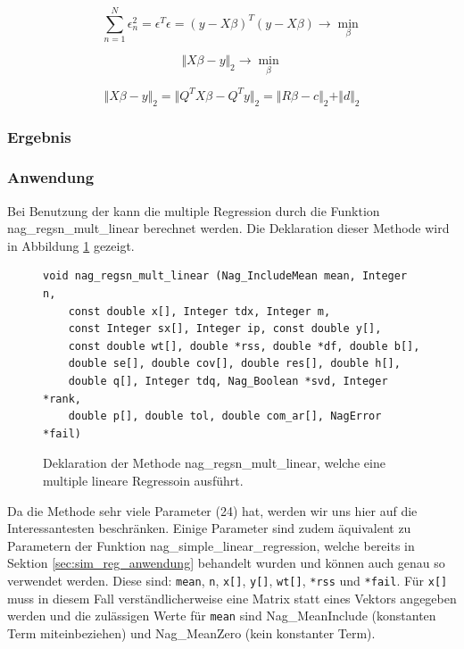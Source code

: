 \begin{equation}
  \label{eq:minimization}
  \sum\limits^{N}_{n=1} \epsilon^2_n = \epsilon^T \epsilon = (y - X \beta)^T (y - X \beta) \rightarrow \min\limits_{\beta}
\end{equation}


\begin{equation}
  \label{eq:minimization_general}
  \Vert X\beta - y \Vert_2 \rightarrow \min\limits_{\beta}
\end{equation}

\begin{equation}
  \label{eq:orthogonal_transformation}
  \Vert X\beta - y \Vert_2 = \Vert Q^T X \beta - Q^T y \Vert_2 = \Vert R \beta - c \Vert_2 + \Vert d \Vert_2
\end{equation}

\subsubsection{Ergebnis}

\subsubsection{Anwendung}

Bei Benutzung der \naglib kann die multiple Regression durch die Funktion nag\_regsn\_mult\_linear berechnet werden.
Die Deklaration dieser Methode wird in Abbildung \ref{fig:nag_multiple_linear} gezeigt.
\begin{figure}[t]
  \centering
\begin{lstlisting}
void nag_regsn_mult_linear (Nag_IncludeMean mean, Integer n, 
    const double x[], Integer tdx, Integer m, 
    const Integer sx[], Integer ip, const double y[], 
    const double wt[], double *rss, double *df, double b[], 
    double se[], double cov[], double res[], double h[], 
    double q[], Integer tdq, Nag_Boolean *svd, Integer *rank, 
    double p[], double tol, double com_ar[], NagError *fail)
\end{lstlisting}
  \caption{Deklaration der Methode nag\_regsn\_mult\_linear, welche eine multiple lineare Regressoin ausführt.}
  \label{fig:nag_multiple_linear}
\end{figure}

Da die Methode sehr viele Parameter (24) hat, werden wir uns hier auf die Interessantesten beschränken.
Einige Parameter sind zudem äquivalent zu Parametern der Funktion nag\_simple\_linear\_regression, welche bereits in Sektion \ref{sec:sim_reg_anwendung} behandelt wurden und können auch genau so verwendet werden.
Diese sind: \lstinline{mean}, \lstinline{n}, \lstinline{x[]}, \lstinline{y[]}, \lstinline{wt[]}, \lstinline{*rss} und \lstinline{*fail}.
Für \lstinline{x[]} muss in diesem Fall verständlicherweise eine Matrix statt eines Vektors angegeben werden und die zulässigen Werte für \lstinline{mean} sind Nag\_MeanInclude (konstanten Term miteinbeziehen) und Nag\_MeanZero (kein konstanter Term).

